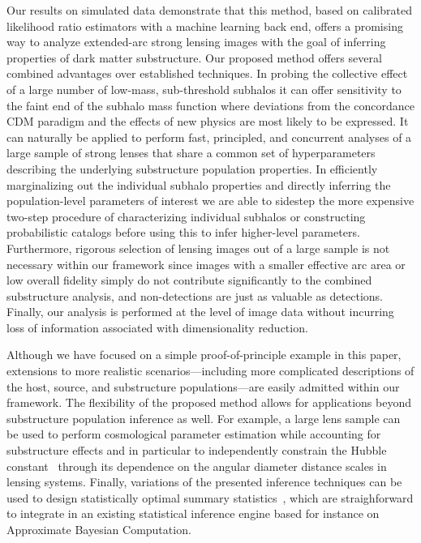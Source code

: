 \documentclass[twocolumn]{aastex62}
\begin{document}
Our results on simulated data demonstrate that this method, based on calibrated likelihood ratio estimators with a machine learning back end, offers a promising way to analyze extended-arc strong lensing images with the goal of inferring properties of dark matter substructure. Our proposed method offers several combined advantages over established techniques. In probing the collective effect of a large number of low-mass, sub-threshold subhalos it can offer sensitivity to the faint end of the subhalo mass function where deviations from the concordance CDM paradigm and the effects of new physics are most likely to be expressed. It can naturally be applied to perform fast, principled, and concurrent analyses of a large sample of strong lenses that share a common set of hyperparameters describing the underlying substructure population properties. In efficiently marginalizing out the individual subhalo properties and directly inferring the population-level parameters of interest we are able to sidestep the more expensive two-step procedure of characterizing individual subhalos or constructing probabilistic catalogs before using this to infer higher-level parameters. Furthermore, rigorous selection of lensing images out of a large sample is not necessary within our framework since images with a smaller effective arc area or low overall fidelity simply do not contribute significantly to the combined substructure analysis, and non-detections are just as valuable as detections. Finally, our analysis is performed at the level of image data without incurring loss of information associated with dimensionality reduction.

Although we have focused on a simple proof-of-principle example in this paper, extensions to more realistic scenarios---including more complicated descriptions of the host, source, and substructure populations---are easily admitted within our framework.  The flexibility of the proposed method allows for applications beyond substructure population inference as well. For example, a large lens sample can be used to perform cosmological parameter estimation while accounting for substructure effects and in particular to independently constrain the Hubble constant~\citep{1907.04869,1907.02533} through its dependence on the angular diameter distance scales in lensing systems. Finally, variations of the presented inference techniques can be used to design statistically optimal summary statistics~\citep{1805.12244}, which are straighforward to integrate in an existing statistical inference engine based for instance on Approximate Bayesian Computation.
\end{document}

